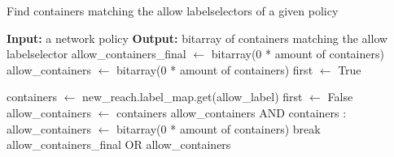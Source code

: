 \begin{algorithm} 
    \caption{Find containers matching the allow labelselectors of a given policy} 
    \label{algo:allow}
    \begin{algorithmic}[1]  
    \State \textbf{Input:} a network policy
    \State \textbf{Output:} bitarray of containers matching the allow labelselector
    \State 
    \State  allow\_containers\_final $\gets$ bitarray(0 * amount of containers)
        \State allow\_containers $\gets$ bitarray(0 * amount of containers)
        \State first $\gets$ True
        
           \State containers $\gets$ new\_reach.label\_map.get(allow\_label)
                    \State first $\gets$ False
                    \State allow\_containers $\gets$ containers
                \Else
                    \State allow\_containers AND containers
                \EndIf
            \Else:
                \State allow\_containers $\gets$ bitarray(0 * amount of containers)
                \State break
            \EndIf
        \EndFor
        \State allow\_containers\_final OR allow\_containers
    \EndFor
  \end{algorithmic}
\end{algorithm}